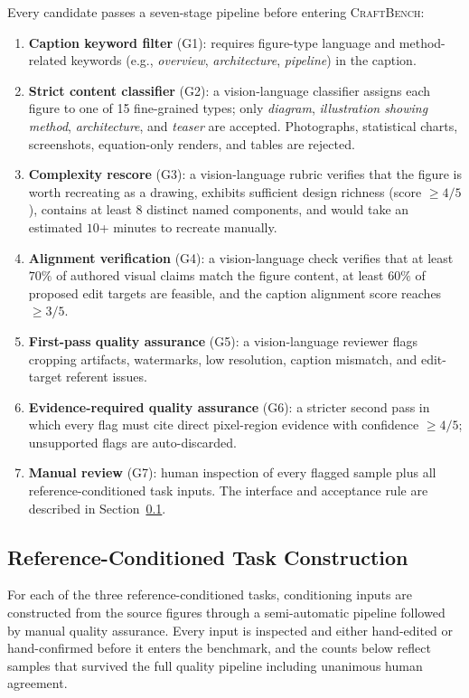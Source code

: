 \documentclass{article}
\newcommand{\CrafterBench}{\textsc{CraftBench}\xspace}
\begin{document}
Every candidate passes a seven-stage pipeline before entering \CrafterBench:
\begin{enumerate}[leftmargin=1.5em, itemsep=0pt, topsep=0pt, parsep=0pt]
    \item \textbf{Caption keyword filter} (G1): requires figure-type language and method-related keywords (e.g., \textit{overview}, \textit{architecture}, \textit{pipeline}) in the caption.
    \item \textbf{Strict content classifier} (G2): a vision-language classifier assigns each figure to one of 15 fine-grained types; only \textit{diagram}, \textit{illustration showing method}, \textit{architecture}, and \textit{teaser} are accepted. Photographs, statistical charts, screenshots, equation-only renders, and tables are rejected.
    \item \textbf{Complexity rescore} (G3): a vision-language rubric verifies that the figure is worth recreating as a drawing, exhibits sufficient design richness (score $\geq 4/5$), contains at least $8$ distinct named components, and would take an estimated $10$+ minutes to recreate manually.
    \item \textbf{Alignment verification} (G4): a vision-language check verifies that at least $70\%$ of authored visual claims match the figure content, at least $60\%$ of proposed edit targets are feasible, and the caption alignment score reaches $\geq 3/5$.
    \item \textbf{First-pass quality assurance} (G5): a vision-language reviewer flags cropping artifacts, watermarks, low resolution, caption mismatch, and edit-target referent issues.
    \item \textbf{Evidence-required quality assurance} (G6): a stricter second pass in which every flag must cite direct pixel-region evidence with confidence $\geq 4/5$; unsupported flags are auto-discarded.
    \item \textbf{Manual review} (G7): human inspection of every flagged sample plus all reference-conditioned task inputs. The interface and acceptance rule are described in Section~\ref{app:bench-edit-construction}.
\end{enumerate}

\subsection{Reference-Conditioned Task Construction}
\label{app:bench-edit-construction}

For each of the three reference-conditioned tasks, conditioning inputs are constructed from the source figures through a semi-automatic pipeline followed by manual quality assurance. Every input is inspected and either hand-edited or hand-confirmed before it enters the benchmark, and the counts below reflect samples that survived the full quality pipeline including unanimous human agreement.
\end{document}
